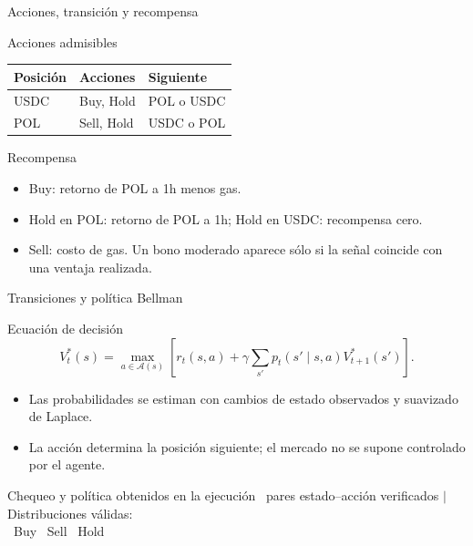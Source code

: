 \documentclass[10pt,aspectratio=169]{beamer}
\begin{document}
\begin{frame}{Acciones, transición y recompensa}
\begin{block}{Acciones admisibles}
\centering
\begin{tabular}{lll}
\toprule
Posición & Acciones & Siguiente \\
\midrule
USDC & Buy, Hold & POL o USDC \\
POL & Sell, Hold & USDC o POL \\
\bottomrule
\end{tabular}
\end{block}
\vspace{.5em}
\begin{block}{Recompensa}
\begin{itemize}
  \item Buy: retorno de POL a 1h menos gas.
  \item Hold en POL: retorno de POL a 1h; Hold en USDC: recompensa cero.
  \item Sell: costo de gas. Un bono moderado aparece sólo si la señal coincide con una ventaja realizada.
\end{itemize}
\end{block}
\end{frame}

\begin{frame}{Transiciones y política Bellman}
\begin{block}{Ecuación de decisión}
\centering
\[
V_t^*(s)=\max_{a\in\mathcal{A}(s)}
\left[r_t(s,a)+\gamma\sum_{s'}p_t(s'\mid s,a)V_{t+1}^*(s')\right].
\]
\end{block}
\begin{itemize}
  \item Las probabilidades se estiman con cambios de estado observados y suavizado de Laplace.
  \item La acción determina la posición siguiente; el mercado no se supone controlado por el agente.
\end{itemize}
\vspace{.2em}
\begin{block}{Chequeo y política obtenidos en la ejecución}
\centering
\TransicionesVerificadas\ pares estado--acción verificados \quad$\vert$\quad Distribuciones válidas: \textbf{\TransicionesValidas}\\[.45em]
\PoliticaBuy\ Buy \qquad \PoliticaSell\ Sell \qquad \PoliticaHold\ Hold
\end{block}
\end{frame}
\end{document}
